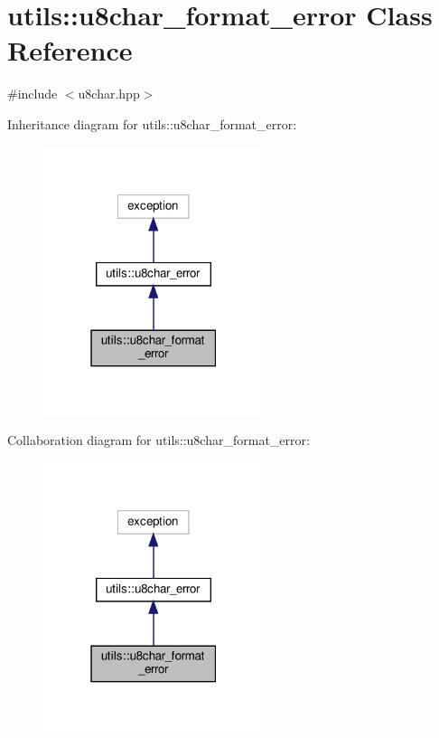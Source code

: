 \hypertarget{classutils_1_1u8char__format__error}{}\section{utils\+:\+:u8char\+\_\+format\+\_\+error Class Reference}
\label{classutils_1_1u8char__format__error}


{\ttfamily \#include $<$u8char.\+hpp$>$}



Inheritance diagram for utils\+:\+:u8char\+\_\+format\+\_\+error\+:\nopagebreak
\begin{figure}[H]
\begin{center}
\leavevmode
\includegraphics[width=183pt]{classutils_1_1u8char__format__error__inherit__graph}
\end{center}
\end{figure}


Collaboration diagram for utils\+:\+:u8char\+\_\+format\+\_\+error\+:\nopagebreak
\begin{figure}[H]
\begin{center}
\leavevmode
\includegraphics[width=183pt]{classutils_1_1u8char__format__error__coll__graph}
\end{center}
\end{figure}



